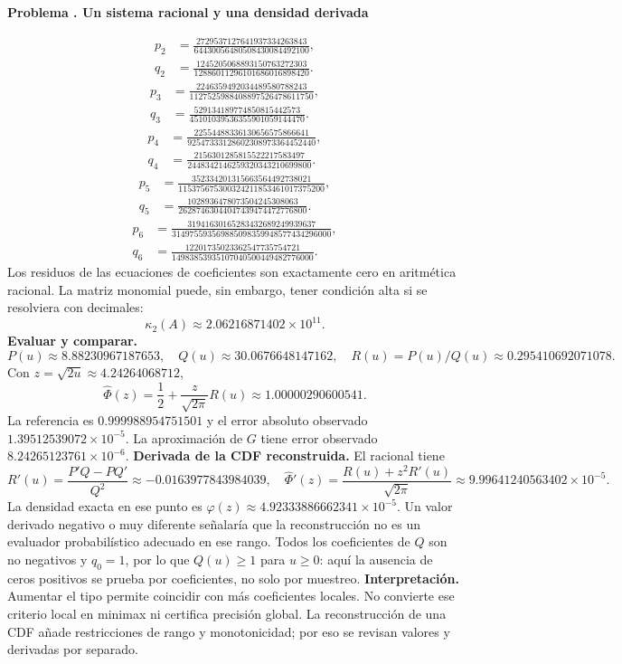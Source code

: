 \documentclass[11pt,a4paper]{article}
\theoremstyle{definition}
\newcounter{problema}
\newenvironment{resuelto}[1]{\refstepcounter{problema}\par\medskip\Needspace{6\baselineskip}\textbf{Problema \theproblema. #1}\par}{\par\medskip}
\begin{document}
\begin{resuelto}{Un sistema racional y una densidad derivada}
\[\]
\[
\begin{aligned}p_2&=\frac{2729537127641937334263843}{64430056480508430084492100},\\q_2&=\frac{1245205068893150763272303}{12886011296101686016898420}.\end{aligned}
\]
\[
\begin{aligned}p_3&=\frac{2246359492034489580788243}{1127525988408897526478611750},\\q_3&=\frac{529134189774850815442573}{45101039536355901059144470}.\end{aligned}
\]
\[
\begin{aligned}p_4&=\frac{22554488336130656575866641}{92547333128602308973364452440},\\q_4&=\frac{2156301285815522217583497}{2448342146259320343210699800}.\end{aligned}
\]
\[
\begin{aligned}p_5&=\frac{352334201315663564492738021}{115375675300324211853461017375200},\\q_5&=\frac{1028936478073504245308063}{26287463044047439474472776800}.\end{aligned}
\]
\[
\begin{aligned}p_6&=\frac{31941630165283432689249939637}{314975593569885098359948577434296000},\\q_6&=\frac{12201735023362547735754721}{14983853935107040500449482776000}.\end{aligned}
\]
Los residuos de las ecuaciones de coeficientes son exactamente cero en aritmética racional. La matriz monomial puede, sin embargo, tener condición alta si se resolviera con decimales:
\[
\kappa_2(A)\approx2.06216871402\times10^{11}.
\]
\textbf{Evaluar y comparar.}
\[
P(u)\approx8.88230967187653,\quad Q(u)\approx30.0676648147162,\quad R(u)=P(u)/Q(u)\approx0.295410692071078.
\]
Con $z=\sqrt{2u}\approx4.24264068712$,
\[
\widehat\Phi(z)=\frac12+\frac z{\sqrt{2\pi}}R(u)\approx1.00000290600541.
\]
La referencia es $0.999988954751501$ y el error absoluto observado $1.39512539072\times10^{-5}$. La aproximación de $G$ tiene error observado $8.24265123761\times10^{-6}$.
\textbf{Derivada de la CDF reconstruida.} El racional tiene
\[
R\prime(u)=\frac{P\prime Q-PQ\prime}{Q^2}\approx-0.0163977843984039,\quad
\widehat\Phi\prime(z)=\frac{R(u)+z^2R\prime(u)}{\sqrt{2\pi}}\approx9.99641240563402\times10^{-5}.
\]
La densidad exacta en ese punto es $\varphi(z)\approx4.92333886662341\times10^{-5}$. Un valor derivado negativo o muy diferente señalaría que la reconstrucción no es un evaluador probabilístico adecuado en ese rango.
Todos los coeficientes de $Q$ son no negativos y $q_0=1$, por lo que $Q(u)\ge1$ para $u\ge0$: aquí la ausencia de ceros positivos se prueba por coeficientes, no solo por muestreo.
\textbf{Interpretación.} Aumentar el tipo permite coincidir con más coeficientes locales. No convierte ese criterio local en minimax ni certifica precisión global. La reconstrucción de una CDF añade restricciones de rango y monotonicidad; por eso se revisan valores y derivadas por separado.
\end{resuelto}
\end{document}
